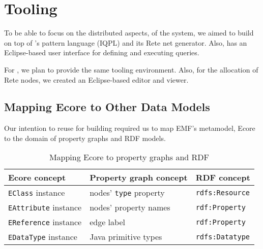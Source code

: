\section{Tooling}
\label{tooling}   

To be able to focus on the distributed aspects, of the system, we aimed to build \iqd{} on top of \eiq{}'s pattern language (IQPL) and its Rete net generator. Also, \eiq{} has an Eclipse-based user interface for defining and executing queries.

For \iqd{}, we plan to provide the same tooling environment. Also, for the allocation of Rete nodes, we created an Eclipse-based editor and viewer.

\subsection{Mapping Ecore to Other Data Models}
\label{ecore-mapping}

Our intention to reuse \eiq{} for building \iqd{} required us to map EMF's metamodel, Ecore to the domain of property graphs and RDF models.

\begin{table}[htb]

\centering
\begin{tabular}{ | l | l | l | }

\hline
\bf Ecore concept          & \bf Property graph concept  & \bf RDF concept \tabularnewline \hline\hline
\verb+EClass+ instance     & nodes' \verb+type+ property & \verb+rdfs:Resource+ \\ \hline
\verb+EAttribute+ instance & nodes' property names       & \verb+rdf:Property+  \\ \hline
\verb+EReference+ instance & edge label                  & \verb+rdf:Property+  \\ \hline
\verb+EDataType+ instance  & Java primitive types        & \verb+rdfs:Datatype+ \\ \hline
 
\end{tabular}
\caption{Mapping Ecore to property graphs and RDF}
\label{tab:ecore-mapping}

\end{table}



